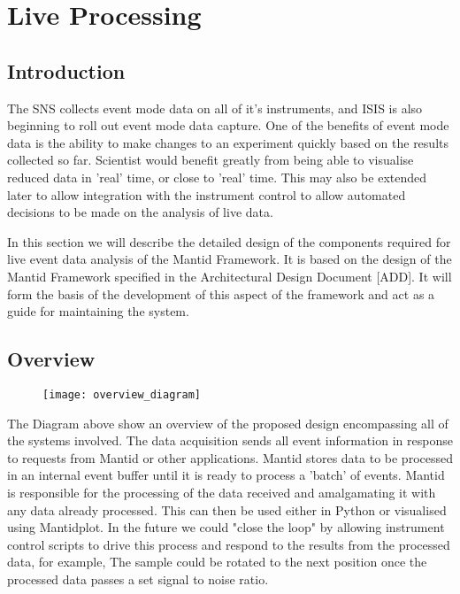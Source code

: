 
\section{Live Processing}

\subsection{Introduction}

The SNS collects event mode data on all of it's instruments, and ISIS is also beginning to roll out event mode data capture.  One of the benefits of event mode data is the ability to make changes to an experiment quickly based on the results collected so far.  Scientist would benefit greatly from being able to visualise reduced data in 'real' time, or close to 'real' time.  This may also be extended later to allow integration with the instrument control to allow automated decisions to be made on the analysis of live data.

In this section we will describe the detailed design of the components required for live event data analysis of the Mantid Framework.  It is based on the design of the Mantid Framework specified in the Architectural Design Document [ADD].
It will form the basis of the development of this aspect of the framework and act as a guide for maintaining the system.

\subsection{Overview}

\begin{figure}[h!]
\centering
\texttt{[image: overview\_diagram]}
\end{figure}

The Diagram above show an overview of the proposed design encompassing all of the systems involved.  The data acquisition sends all event information in response to requests from Mantid or other applications.  Mantid stores data to be processed in an internal event buffer  until it is ready to process a 'batch' of events.  Mantid is responsible for the processing of the data received and amalgamating it with any data already processed.  This can then be used either in Python or visualised using Mantidplot.  In the future we could "close the loop" by allowing instrument control scripts to drive this process and respond to the results from the processed data, for example, The sample could be rotated to the next position once the processed data passes a set signal to noise ratio.

